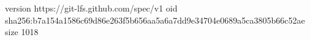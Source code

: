 version https://git-lfs.github.com/spec/v1
oid sha256:b7a154a1586c69d86e263f5b656aa5a6a7dd9e34704e0689a5ca3805b66c52ae
size 1018
